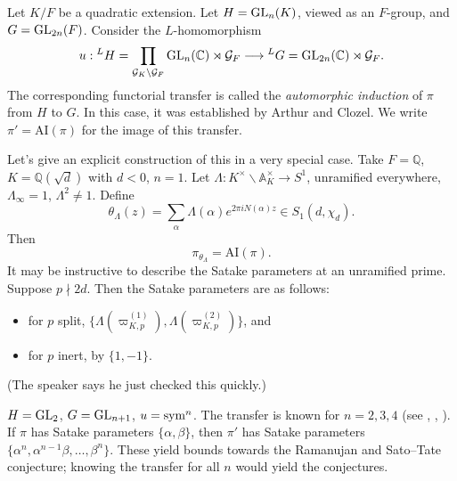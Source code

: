 \documentclass[reqno]{amsart} 
\begin{document}
\begin{example}
  Let $K /F$ be a quadratic extension.  Let $H = \operatorname{GL}_n(K)$, viewed as an $F$-group, and $G = \operatorname{GL}_{2n}(F)$.  Consider the $L$-homomorphism
  \begin{equation*}
    u : {}^L H
    =
    \prod_{\mathcal{G}_K \backslash \mathcal{G}_F} \operatorname{GL}_n(\mathbb{C}) \rtimes \mathcal{G}_F
    \longrightarrow {}^L G
    = \operatorname{GL}_{2 n}(\mathbb{C}) \rtimes \mathcal{G}_F.    
  \end{equation*}
  The corresponding functorial transfer is called the \emph{automorphic induction} of $\pi$ from $H$ to $G$.  In this case, it was established by Arthur and Clozel.  We write $\pi ' = \mathrm{AI}(\pi)$ for the image of this transfer.

  Let's give an explicit construction of this in a very special case.  Take $F = \mathbb{Q}$, $K = \mathbb{Q}(\sqrt{d})$ with $d < 0$, $n = 1$.  Let $\Lambda : K^\times \backslash \mathbb{A}_K^\times \rightarrow S^1$, unramified everywhere, $\Lambda_\infty = 1$, $\Lambda^2 \neq 1$.  Define
  \begin{equation*}
    \theta_\Lambda(z) = \sum_{\alpha} \Lambda(\alpha) e^{2 \pi i N(\alpha) z}
    \in S_1(d, \chi_d).
  \end{equation*}
  Then
  \begin{equation*}
    \pi_{\theta_\Lambda} = \mathrm{AI}(\pi).
  \end{equation*}
  It may be instructive to describe the Satake parameters at an unramified prime.  Suppose $p \nmid 2 d$.  Then the Satake parameters are as follows:
  \begin{itemize}
  \item for $p$ split, $\{\Lambda(\varpi_{K, p}^{(1)}), \Lambda(\varpi_{K, p}^{(2)})\}$, and
  \item for $p$ inert, by $\{1, -1\}$.
  \end{itemize}
  (The speaker says he just checked this quickly.)
\end{example}

\begin{example}
  $H = \operatorname{GL}_2$, $G = \operatorname{GL}_{n + 1}$, $u = \operatorname{sym}^n$.  The transfer is known for $n = 2, 3, 4$ (see \cite{MR533066}, \cite{MR1923967}, \cite{MR1937203}).  If $\pi$ has Satake parameters $\{\alpha, \beta\}$, then $\pi '$ has Satake parameters $\{\alpha^n, \alpha^{n - 1} \beta, \dotsc, \beta^n\}$.  These yield bounds towards the Ramanujan and Sato--Tate conjecture; knowing the transfer for all $n$ would yield the conjectures.
\end{example}


{} 
\end{document}
